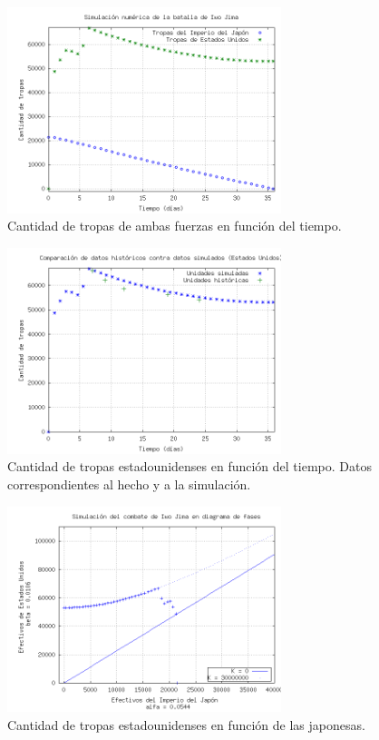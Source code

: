\documentclass{sig-alternate}
\begin{document}
\begin{figure}[h]
\begin{center}
\includegraphics[width=8cm]{jap_vs_usa.png}
\caption{\label{fig:trays}Cantidad de tropas de ambas fuerzas en función del tiempo.}
\end{center}
\end{figure}

\begin{figure}[h]
\begin{center}
\includegraphics[width=8cm]{real_vs_sim.png}
\caption{\label{fig:realvssim}Cantidad de tropas estadounidenses en función del tiempo. Datos correspondientes al hecho y a la simulación.}
\end{center}
\end{figure}

\begin{figure}[h]
\begin{center}
\includegraphics[width=8cm]{power_area_iwo_jima.png}
\caption{\label{fig:xvsy}Cantidad de tropas estadounidenses en función de las japonesas.}
\end{center}
\end{figure}
\end{document}
